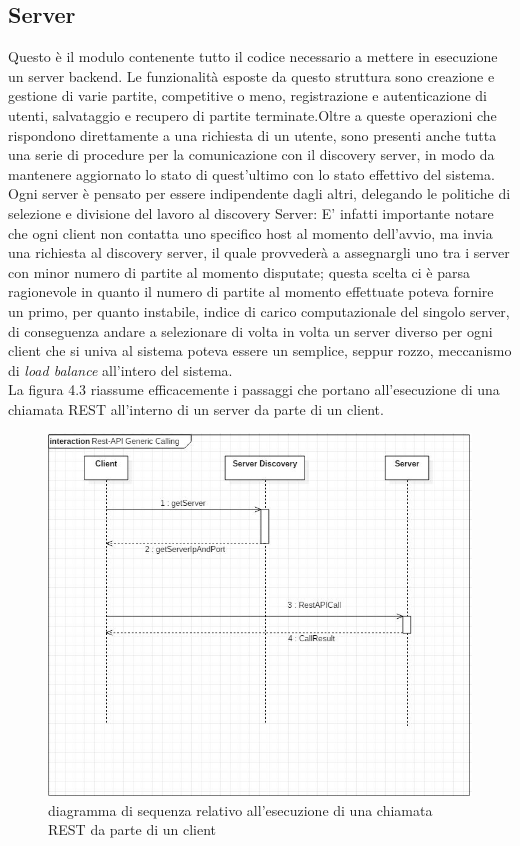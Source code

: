       \subsection {Server}\label{subsec:details:server}
      Questo è il modulo contenente tutto il codice necessario a mettere in esecuzione un server backend. Le funzionalità esposte da questo struttura sono creazione e gestione di varie partite, competitive o meno, registrazione e autenticazione di utenti, salvataggio e recupero di partite terminate.Oltre a queste operazioni che rispondono direttamente a una richiesta di un utente, sono presenti anche tutta una serie di procedure per la comunicazione con il discovery server, in modo da mantenere aggiornato lo stato di quest'ultimo con lo stato effettivo del sistema.\\
      Ogni server è pensato per essere indipendente dagli altri, delegando le politiche di selezione e divisione del lavoro al discovery Server:
      E' infatti importante notare che ogni client non contatta uno specifico host al momento dell'avvio, ma invia una richiesta al discovery server, il quale provvederà a assegnargli uno tra i server con minor numero di partite al momento disputate; questa scelta ci è parsa ragionevole in quanto il numero di partite al momento effettuate poteva fornire un primo, per quanto instabile, indice di carico computazionale del singolo server, di conseguenza andare a selezionare di volta in volta un server diverso per ogni client che si univa al sistema poteva essere un semplice, seppur rozzo, meccanismo di \textit{load balance} all'intero del sistema.\\
      La figura 4.3 riassume efficacemente i passaggi che portano all'esecuzione di una chiamata REST all'interno di un server da parte di un client.\\

      \begin{figure}[H]
        \includegraphics[width=\textwidth,height=\textheight,keepaspectratio]{restAPICall}
         \caption{diagramma di sequenza relativo all'esecuzione di una chiamata REST da parte di un client}
      \end{figure}

